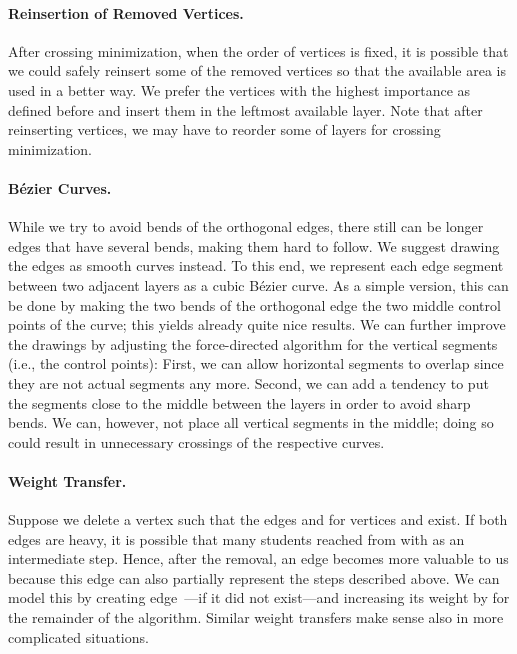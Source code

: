 \documentclass[]{llncs}
\begin{document}
\paragraph{Reinsertion of Removed Vertices.}
After crossing minimization, when the order of vertices is
fixed, it is possible that we could safely reinsert some of the
removed vertices so that the available area is used in a better way.
We prefer the vertices with the highest importance as
defined before and insert them in the leftmost available layer.
Note that after reinserting vertices, we may
have to reorder some of layers for crossing minimization.

\paragraph{B\'ezier Curves.}
While we try to avoid bends of the orthogonal edges, there still can
be longer edges that have several bends, making them hard to follow.
We suggest drawing the edges as smooth curves
instead. To this end, we represent each edge segment between two
adjacent layers as a cubic B\'ezier curve. As a simple
version, this can be done by making the two bends of the orthogonal
edge the two middle control points of the curve; this yields already quite
nice results. We can further improve the drawings by
adjusting the force-directed algorithm for the vertical segments
(i.e., the control points): First, we can allow horizontal segments
to overlap since they are not actual segments any more. Second, we can
add a tendency to put the segments close to the middle between the
layers in order to avoid sharp bends. We can, however, not place all
vertical segments in the middle; doing so could result in unnecessary
crossings of the respective curves.

\paragraph{Weight Transfer.}
Suppose we delete a vertex  such that the edges
 and  for vertices  and  exist. If both edges are
heavy, it is possible that many students reached  from  with
 as an intermediate step. Hence, after the removal, an edge
 becomes more valuable to us because this edge can also
partially represent the steps described above. We can
model this by creating edge~---if it did not exist---and
increasing its weight by  for the
remainder of the algorithm. Similar weight transfers make sense also
in more complicated situations.
\end{document}
